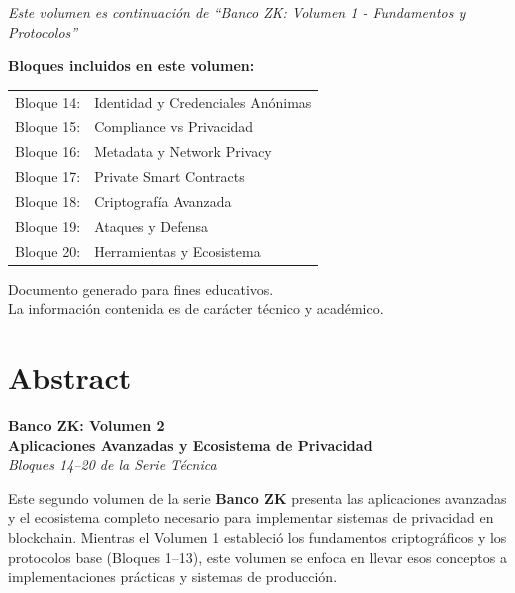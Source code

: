 \documentclass[11pt,a4paper,twoside]{book}
\theoremstyle{definition}
\theoremstyle{remark}
\begin{document}
\thispagestyle{empty}
\vspace*{\fill}
\begin{center}
\textit{Este volumen es continuación de ``Banco ZK: Volumen 1 - Fundamentos y Protocolos''}

\vspace{1cm}

\textbf{Bloques incluidos en este volumen:}\\[0.5cm]
\begin{tabular}{rl}
Bloque 14: & Identidad y Credenciales Anónimas \\
Bloque 15: & Compliance vs Privacidad \\
Bloque 16: & Metadata y Network Privacy \\
Bloque 17: & Private Smart Contracts \\
Bloque 18: & Criptografía Avanzada \\
Bloque 19: & Ataques y Defensa \\
Bloque 20: & Herramientas y Ecosistema \\
\end{tabular}

\vspace{2cm}

\small
Documento generado para fines educativos.\\
La información contenida es de carácter técnico y académico.
\end{center}
\vspace*{\fill}
\clearpage

\chapter*{Abstract}

\begin{center}
\textbf{\Large Banco ZK: Volumen 2}\\[0.3cm]
\textbf{Aplicaciones Avanzadas y Ecosistema de Privacidad}\\[0.5cm]
\textit{Bloques 14--20 de la Serie Técnica}
\end{center}

\vspace{0.5cm}

Este segundo volumen de la serie \textbf{Banco ZK} presenta las aplicaciones avanzadas y el ecosistema completo necesario para implementar sistemas de privacidad en blockchain. Mientras el Volumen 1 estableció los fundamentos criptográficos y los protocolos base (Bloques 1--13), este volumen se enfoca en llevar esos conceptos a implementaciones prácticas y sistemas de producción.
\end{document}
